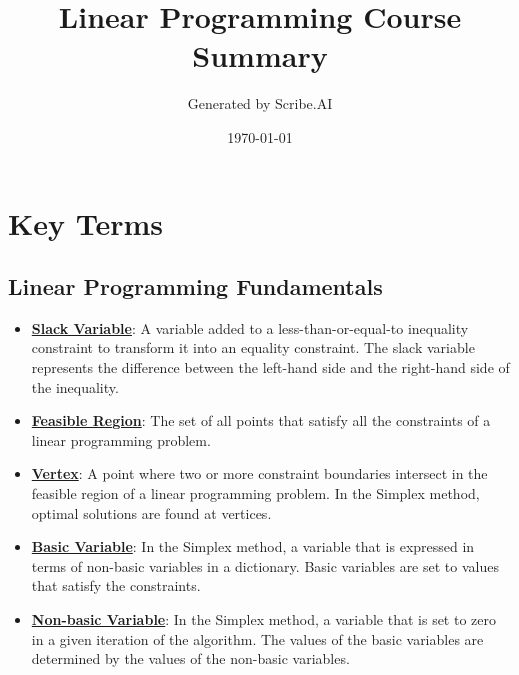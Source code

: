 \documentclass{article}%
\title{Linear Programming Course Summary}%
\author{Generated by Scribe.AI}%
\date{\today}%
\begin{document}
%
\normalsize%
\maketitle%
\section{Key Terms}%
\label{sec:KeyTerms}%
\subsection{Linear Programming Fundamentals}%
\label{subsec:LinearProgrammingFundamentals}%
\begin{itemize}[leftmargin=*]%
\item \href{https://www.math.purdue.edu/~yipn/421/2024-08-27-ExSimplex.pdf#page=1}{\textbf{Slack Variable}}: A variable added to a less-than-or-equal-to inequality constraint to transform it into an equality constraint.  The slack variable represents the difference between the left-hand side and the right-hand side of the inequality.%
\item \href{https://www.math.purdue.edu/~yipn/421/2024-08-27-ExSimplex.pdf#page=4}{\textbf{Feasible Region}}: The set of all points that satisfy all the constraints of a linear programming problem.%
\item \href{https://www.math.purdue.edu/~yipn/421/2024-08-27-ExSimplex.pdf#page=5}{\textbf{Vertex}}: A point where two or more constraint boundaries intersect in the feasible region of a linear programming problem.  In the Simplex method, optimal solutions are found at vertices.%
\item \href{https://www.math.purdue.edu/~yipn/421/2024-08-27-ExSimplex.pdf#page=6}{\textbf{Basic Variable}}: In the Simplex method, a variable that is expressed in terms of non-basic variables in a dictionary.  Basic variables are set to values that satisfy the constraints.%
\item \href{https://www.math.purdue.edu/~yipn/421/2024-08-27-ExSimplex.pdf#page=6}{\textbf{Non-basic Variable}}: In the Simplex method, a variable that is set to zero in a given iteration of the algorithm.  The values of the basic variables are determined by the values of the non-basic variables.%
\end{itemize}

%
\end{document}
